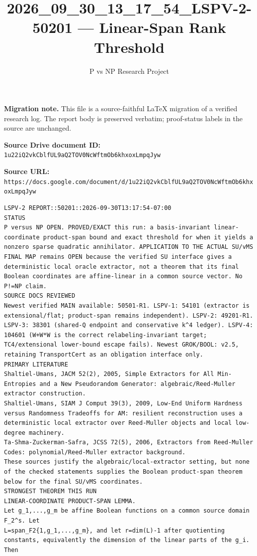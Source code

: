 \documentclass[11pt]{article}
\title{2026\_09\_30\_13\_17\_54\_LSPV-2-50201 — Linear-Span Rank Threshold}
\author{P vs NP Research Project}
\date{}
\begin{document}
\maketitle

\noindent\textbf{Migration note.} This file is a source-faithful LaTeX migration of a verified research log. The report body is preserved verbatim; proof-status labels in the source are unchanged.

\noindent\textbf{Source Drive document ID:} \texttt{1u22iQ2vkCblfUL9aQ2TOV0NcWftmOb6khxoxLmpqJyw}

\noindent\textbf{Source URL:} \texttt{https://docs.google.com/document/d/1u22iQ2vkCblfUL9aQ2TOV0NcWftmOb6khxoxLmpqJyw}

\bigskip
\begin{Verbatim}[breaklines=true,breakanywhere=true]
LSPV-2 REPORT::50201::2026-09-30T13:17:54-07:00
STATUS
P versus NP OPEN. PROVED/EXACT this run: a basis-invariant linear-coordinate product-span bound and exact threshold for when it yields a nonzero sparse quadratic annihilator. APPLICATION TO THE ACTUAL SU/vMS FINAL MAP remains OPEN because the verified SU interface gives a deterministic local oracle extractor, not a theorem that its final Boolean coordinates are affine-linear in a common source vector. No P!=NP claim.
SOURCE DOCS REVIEWED
Newest verified MAIN available: 50501-R1. LSPV-1: 54101 (extractor is extensional/flat; product-span remains independent). LSPV-2: 49201-R1. LSPV-3: 38301 (shared-Q endpoint and conservative k^4 ledger). LSPV-4: 104601 (W+W*W is the correct relabeling-invariant target; TC4/extensional lower-bound escape fails). Newest GROK/BOOL: v2.5, retaining TransportCert as an obligation interface only.
PRIMARY LITERATURE
Shaltiel-Umans, JACM 52(2), 2005, Simple Extractors for All Min-Entropies and a New Pseudorandom Generator: algebraic/Reed-Muller extractor construction.
Shaltiel-Umans, SIAM J Comput 39(3), 2009, Low-End Uniform Hardness versus Randomness Tradeoffs for AM: resilient reconstruction uses a deterministic local extractor over Reed-Muller objects and local low-degree machinery.
Ta-Shma-Zuckerman-Safra, JCSS 72(5), 2006, Extractors from Reed-Muller Codes: polynomial/Reed-Muller extractor background.
These sources justify the algebraic/local-extractor setting, but none of the checked statements supplies the Boolean product-span theorem below for the final SU/vMS coordinates.
STRONGEST THEOREM THIS RUN
LINEAR-COORDINATE PRODUCT-SPAN LEMMA.
Let g_1,...,g_m be affine Boolean functions on a common source domain F_2^s. Let
L=span_F2{1,g_1,...,g_m}, and let r=dim(L)-1 after quotienting constants, equivalently the dimension of the linear parts of the g_i. Then

\end{Verbatim}
\end{document}
